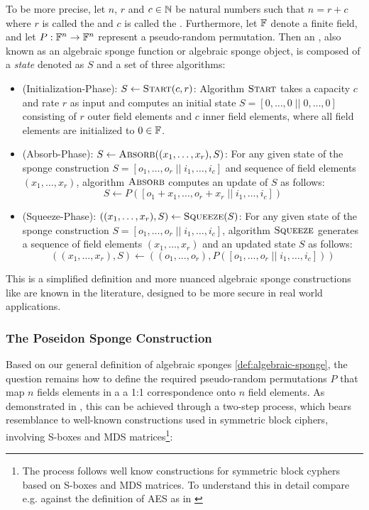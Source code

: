 To be more precise, let $n$, $r$ and $c \in \mathbb{N}$ be natural numbers such that $n = r + c$ where $r$ is called the  and $c$ is called the . Furthermore, let $\mathbb{F}$ denote a finite field, and let $P: \mathbb{F}^n \to \mathbb{F}^n$ represent a pseudo-random permutation. Then an , also known as an algebraic sponge function or algebraic sponge object, is composed of a \textit{state} denoted as $S$ and a set of three algorithms:
\begin{itemize}\label{def:algebraic-sponge}
\item (Initialization-Phase): $S\leftarrow \textsc{Start}(c,r)$: Algorithm $\textsc{Start}$ takes a capacity $c$ and rate $r$ as input and computes an initial state $S=[0,\ldots,0\;||\;0,\ldots,0]$ consisting of $r$ outer field elements and
$c$ inner field elements, where all field elements are initialized to $0\in\mathbb{F}$.
\item (Absorb-Phase): $S\leftarrow \textsc{Absorb}((x_1,\ldots,x_r),S)$: For any given state of the sponge construction $S=[o_1,\ldots,o_r\;||\;i_1,\ldots,i_c]$ and sequence of field elements $(x_1,\ldots,x_r)$, algorithm $\textsc{Absorb}$ computes an update of $S$ as follows: 
\begin{equation}
S \leftarrow P\left([o_1+x_1,\ldots,o_r+x_r\;||\;i_1,\ldots,i_c]\right)
\end{equation}
\item (Squeeze-Phase): $((x_1,\ldots,x_r), S)\leftarrow\textsc{Squeeze}(S)$: For any given state of the sponge construction $S=[o_1,\ldots,o_r\;||\;i_1,\ldots,i_c]$, algorithm $\textsc{Squeeze}$ generates a sequence of field elements $(x_1,\ldots,x_r)$ and an updated state $S$ as follows: 
\begin{equation}
((x_1,\ldots,x_r), S) \leftarrow ((o_1,\ldots,o_r),P([o_1,\ldots,o_r\;||\;i_1,\ldots,i_c]))
\end{equation}
\end{itemize}
This is a simplified definition and more nuanced algebraic sponge constructions like \cite{aum-23} are known in the literature, designed to be more secure in real world applications.

\subsubsection{The Poseidon Sponge Construction}\label{sec:poseidon-sponge}
Based on our general definition of algebraic sponges \ref{def:algebraic-sponge}, the question remains how to define the required pseudo-random permutations $P$ that map $n$ fields elements in a a 1:1 correspondence onto $n$ field elements. As demonstrated in \cite{lor-19}, this can be achieved through a two-step process, which bears resemblance to well-known constructions used in symmetric block ciphers, involving S-boxes and MDS matrices\footnote{The process follows well know constructions for symmetric block cyphers based on S-boxes and MDS matrices. To understand this in detail compare \cite{lor-19} e.g. against the definition of AES as in \cite{duv-18}}:

